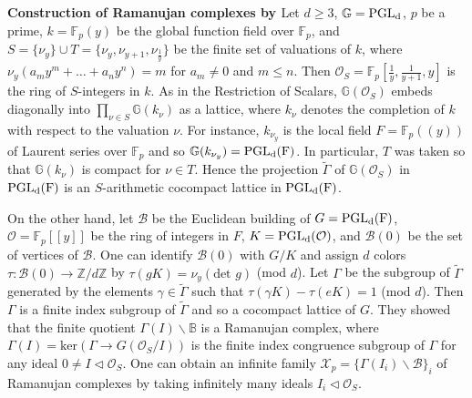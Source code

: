 \documentclass[letterpaper, reqno, 11pt]{amsart}
\theoremstyle{definition}
\theoremstyle{definition}
\theoremstyle{remark}
\newcommand{\Ga}{\Gamma}
\begin{document}
\bigskip
\textbf{Construction of Ramanujan complexes by \cite{lubotzky2005explicit}}
    Let $d \geq 3$, $\mathbb{G}=\rm{PGL}_d$, $p$ be a prime, $k=\mathbb{F}_p(y)$ be the global function field over $\mathbb{F}_p$, and $S=\{\nu_y\}\cup T =\{\nu_y,\nu_{y+1},\nu_{\frac{1}{y}}\}$ be the finite set of valuations of $k$, where $\nu_y(a_my^m+\dots+a_ny^n)=m$ for $a_m \neq 0$ and $m \leq n$.
    Then $\mathcal{O}_S=\mathbb{F}_p[\frac{1}{y},\frac{1}{y+1},y]$ is the ring of $S$-integers in $k$. As in the Restriction of Scalars, $\mathbb{G}(\mathcal{O}_S)$ embeds diagonally into $\prod_{\nu \in S}\mathbb{G}(k_\nu)$ as a lattice, where $k_\nu$ denotes the completion of $k$ with respect to the valuation $\nu$. For instance, $k_{\nu_{y}}$ is the local field $F=\mathbb{F}_p((y))$ of Laurent series over $\mathbb{F}_p$ and so $\mathbb{G}(k_{\nu_{y}})=\rm{PGL}_d(F)$. In particular, $T$ was taken so that $\mathbb{G}(k_\nu)$ is compact for $\nu \in T$. Hence the projection $\tilde{\Gamma}$ of $\mathbb{G}(\mathcal{O}_S)$ in $\rm{PGL}_d(F)$ is an $S$-arithmetic cocompact lattice in $\rm{PGL}_d(F)$. 

    On the other hand, let $\mathcal{B}$ be the Euclidean building of $G=\rm{PGL}_d(F)$, $\mathcal{O}=\mathbb{F}_p[[y]]$ be the ring of integers in $F$, $K=\rm{PGL}_d(\mathcal{O})$, and  $\mathcal{B}(0)$ be the set of vertices of $\mathcal{B}$. One can identify $\mathcal{B}(0)$ with $G/K$ and assign $d$ colors $\tau:\mathcal{B}(0) \to \mathbb{Z}/d\mathbb{Z}$ by $\tau(gK)=\nu_y(\text{det } g)$ (mod $d$).
    Let $\Gamma$ be the subgroup of $\tilde{\Gamma}$ generated by the elements $\gamma \in \tilde{\Gamma}$ such that $\tau(\gamma K)-\tau(e K)=1$ (mod $d$).
    Then $\Ga$ is a finite index subgroup of $\tilde{\Ga}$ and so a cocompact lattice of $G$.
    They showed that the finite quotient $\Gamma(I) \backslash \mathbb{B}$ is a Ramanujan complex, where 
    $\Gamma(I)=\text{ker}(\Gamma \to G(\mathcal{O}_S/I))$ is the finite index congruence subgroup of $\Gamma$ for any ideal $0 \neq I \triangleleft \mathcal{O}_S$. One can obtain an infinite family $\mathscr{X}_p= \{ \Gamma(I_i)\backslash \mathcal{B}\}_i$ of Ramanujan complexes by taking infinitely many ideals $I_i\triangleleft \mathcal{O}_S$.

 

\end{document}
